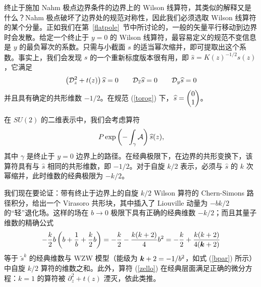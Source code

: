 终止于施加 Nahm 极点边界条件的边界上的 Wilson 线算符，其类似的解释又是什么？Nahm 极点破坏了边界处的规范对称性，因此我们必须选取 Wilson 线算符的某个分量。正如我们在第~\ref{flatpole}~节中所讨论的，一般的矢量平行移动到边界时会发散。给定一个终止于 $y=0$ 的 Wilson 线算符，最容易定义的规范不变信息是 $y$ 的最负幂次的系数。只需与小截面 $s$ 的适当幂次缩并，即可提取出这个系数。事实上，我们会发现 $s$ 的一个重新标度版本很有用，即 $\hat s = K(z)^{-1/2} s(z)$，它满足
\begin{equation}
\left( \D_z^2 + t(z) \right) \hat s=0 \qquad \D_{\bar z} \hat s =0 \qquad \D_{y} \hat s = 0
\end{equation}
并且具有确定的共形维数 $-1/2$。在规范 (\ref{torog}) 下，$\hat s=\begin{pmatrix}0\cr 1\end{pmatrix}$。


在 $SU(2)$ 的二维表示中，我们会考虑算符
\begin{equation}\label{zello}
P \exp \left (-\int_\gamma \A\right)  \hat s(z),
\end{equation}
其中 $\gamma$ 是终止于 $y=0$ 边界上的路径。在经典极限下，在边界的共形变换下，该算符具有与 $\hat s$ 相同的共形维数，即 $-1/2$。对于自旋 $k/2$ 表示，必须与 $\hat s$ 的 $k$ 次幂缩并，此时维数的经典极限为 $-k/2$。


我们现在要论证：带有终止于边界上的自旋 $k/2$ Wilson 算符的 Chern-Simons 路径积分，给出一个 Virasoro 共形块，其中插入了 Liouville 动量为 $-b k/2$ 的“轻”退化场。这样的场在 $b \to 0$ 极限下具有正确的经典维数 $-k/2$；而且其量子维数的精确公式
\begin{equation}
-\frac{k}{2} b\left(b+\frac{1}{b} + \frac{k}{2} b\right) = -\frac{k}{2} - \frac{k(k+2)}{4}b^2=-\frac{k}{2}
+\frac{k(k+2)}{4(\k+2)}
\end{equation}
等于 $\tilde s^k$ 的经典维数与 WZW 模型（能级为 $\k+2=-1/b^2$，如式 (\ref{bpar}) 所示）中自旋 $k/2$ 算符的维数之和。此外，算符 (\ref{zello}) 在经典层面满足正确的微分方程：$k=1$ 的算符被 $\partial_z^2 + t(z)$ 湮灭，依此类推。

